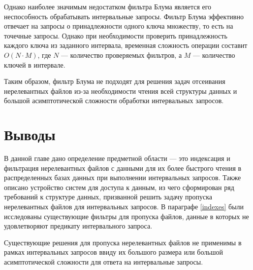 Однако наиболее значимым недостатком фильтра Блума является его неспособность обрабатывать интервальные запросы. Фильтр Блума эффективно отвечает на запросы о принадлежности одного ключа множеству, то есть на точечные запросы. Однако при необходимости проверить принадлежность каждого ключа из заданного интервала, временная сложность операции составит $O(N \cdot M)$, где $N$ --- количество проверяемых фильтров, а $M$ --- количество ключей в интервале. 

Таким образом, фильтр Блума не подходят для решения задач отсеивания нерелевантных файлов из-за необходимости чтения всей структуры данных и большой асимптотической сложности обработки интервальных запросов.


\newpage
\section*{Выводы}

В данной главе дано определение предметной области --- это индексация и фильтрация нерелевантных файлов с данными для их более быстрого чтения в распределенных базах данных при выполнении интервальных запросов. Также описано устройство систем для доступа к данным, из чего сформирован ряд требований к структуре данных, призванной решить задачу пропуска нерелевантных файлов для интервальных запросов. В параграфе \ref{indexes} были исследованы существующие фильтры для пропуска файлов, данные в которых не удовлетворяют предикату интервального запроса.

Существующие решения для пропуска нерелевантных файлов не применимы в рамках интервальных запросов ввиду их большого размера или большой асимптотической сложности для ответа на интервальные запросы.
